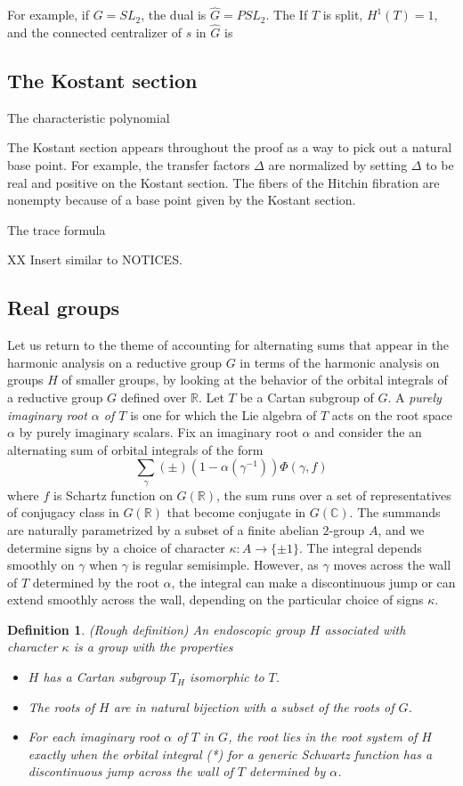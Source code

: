 \documentclass[brochure,english,12pt]{bourbaki}
\newtheorem{definition}[equation]{Definition}
\newcommand{\ring}[1]{\mathbb{#1}}
\begin{document}
For example, if $G=SL_2$, the dual is $\hat G = PSL_2$.  The If $T$ is
split, $H^1(T)=1$, and the connected centralizer of $s$ in $\hat G$ is

\subsection{The Kostant section}

The characteristic polynomial

The Kostant section appears throughout the proof as a way to pick
out a natural base point.  For example, the transfer factors $\Delta$
are normalized by setting $\Delta$ to be real and positive on the
Kostant section.  The fibers of the Hitchin fibration are nonempty
because of a base point given by the Kostant section. 


The trace formula

XX Insert similar to NOTICES.

\subsection{Real groups}

Let us return to the theme of accounting for alternating sums that
appear in the harmonic analysis on a reductive group $G$ in terms of
the harmonic analysis on groups $H$ of smaller groups, by looking at
the behavior of the orbital integrals of a reductive group $G$ defined
over $\ring{R}$.  Let $T$ be a Cartan subgroup of $G$.  A {\it purely
  imaginary root $\alpha$ of $T$} is one for which the Lie algebra of $T$
acts on the root space $\alpha$ by purely imaginary scalars.
Fix an imaginary root $\alpha$ and
consider the an alternating sum of orbital integrals of the form
\[
\sum_\gamma (\pm) (1-\alpha(\gamma^{-1})) \Phi(\gamma,f)
\]
where $f$ is Schartz function on $G(\ring{R})$, the sum runs over a
set of representatives of conjugacy class in $G(\ring{R})$ that become
conjugate in $G(\ring{C})$.  The summands are naturally parametrized
by a subset of a finite abelian $2$-group $A$, and we determine signs
by a choice of character $\kappa:A\to \{ \pm1 \}$.  The integral
depends smoothly on $\gamma$ when $\gamma$ is regular semisimple.
However, as $\gamma$ moves across the wall of $T$ determined by the
root $\alpha$, the integral can make a discontinuous jump or can extend
smoothly across the wall, depending on the particular choice of signs
$\kappa$.  

\begin{definition}
(Rough definition)
An endoscopic group $H$ associated with character $\kappa$ is a group
with the properties
\begin{itemize}
\item $H$ has a Cartan subgroup $T_H$ isomorphic to $T$.
\item The roots of $H$ are in natural bijection with a subset of the roots of $G$.
\item For each imaginary root $\alpha$ of $T$ in $G$, the root
lies in the root system of $H$ exactly when the orbital integral (*)
for a generic Schwartz function has a discontinuous jump across 
the wall of $T$ determined by $\alpha$.
\end{itemize}
\end{definition}
\end{document}
